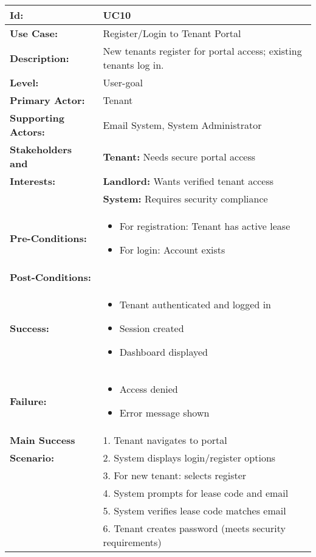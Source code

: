 \documentclass[12pt]{article}
\begin{document}
\begin{longtable}{|p{3cm}|p{11cm}|}
\hline
\textbf{Id:} & UC10 \\
\hline
\textbf{Use Case:} & Register/Login to Tenant Portal \\
\hline
\textbf{Description:} & New tenants register for portal access; existing tenants log in. \\
\hline
\textbf{Level:} & User-goal \\
\hline
\textbf{Primary Actor:} & Tenant \\
\hline
\textbf{Supporting Actors:} & Email System, System Administrator \\
\hline
\textbf{Stakeholders and} & \textbf{Tenant:} Needs secure portal access \\
\textbf{Interests:} & \textbf{Landlord:} Wants verified tenant access \\
& \textbf{System:} Requires security compliance \\
\hline
\textbf{Pre-Conditions:} & 
\begin{itemize}
    \item For registration: Tenant has active lease
    \item For login: Account exists
\end{itemize} \\
\hline
\textbf{Post-Conditions:} & \\
\textbf{Success:} & 
\begin{itemize}
    \item Tenant authenticated and logged in
    \item Session created
    \item Dashboard displayed
\end{itemize} \\
\textbf{Failure:} & 
\begin{itemize}
    \item Access denied
    \item Error message shown
\end{itemize} \\
\hline
\textbf{Main Success} & 1. Tenant navigates to portal \\
\textbf{Scenario:} & 2. System displays login/register options \\
& 3. For new tenant: selects register \\
& 4. System prompts for lease code and email \\
& 5. System verifies lease code matches email \\
& 6. Tenant creates password (meets security requirements) \\

\end{longtable}
\end{document}

